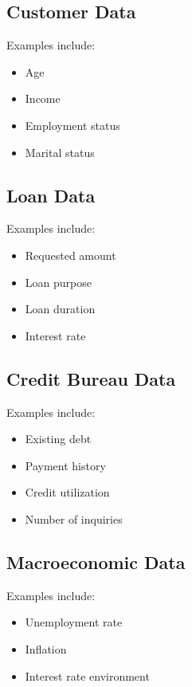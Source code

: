 \subsection{Customer Data}

Examples include:

\begin{itemize}
    \item Age
    \item Income
    \item Employment status
    \item Marital status
\end{itemize}

\subsection{Loan Data}

Examples include:

\begin{itemize}
    \item Requested amount
    \item Loan purpose
    \item Loan duration
    \item Interest rate
\end{itemize}

\subsection{Credit Bureau Data}

Examples include:

\begin{itemize}
    \item Existing debt
    \item Payment history
    \item Credit utilization
    \item Number of inquiries
\end{itemize}

\subsection{Macroeconomic Data}

Examples include:

\begin{itemize}
    \item Unemployment rate
    \item Inflation
    \item Interest rate environment
\end{itemize}


